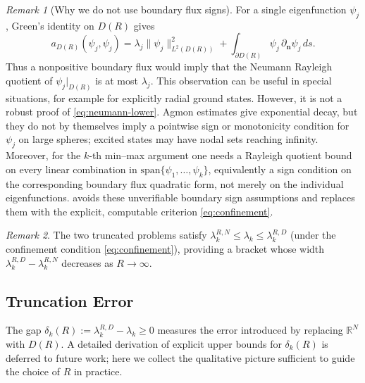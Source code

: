 \documentclass[11pt]{article}
\theoremstyle{plain}
\theoremstyle{definition}
\theoremstyle{remark}
\newtheorem{remark}{Remark}
\newcommand{\R}{\mathbb{R}}
\begin{document}
\begin{remark}[Why we do not use boundary flux signs]
\label{rmk:boundary-sign}
For a single eigenfunction $\psi_j$, Green's identity on $D(R)$
gives
\[
  a_{D(R)}(\psi_j,\psi_j)
  =
  \lambda_j\|\psi_j\|_{L^2(D(R))}^2
  +
  \int_{\partial D(R)}\psi_j\,\partial_{\bm n}\psi_j\,ds .
\]
Thus a nonpositive boundary flux would imply that the Neumann
Rayleigh quotient of $\psi_j|_{D(R)}$ is at most $\lambda_j$.
This observation can be useful in special situations, for example
for explicitly radial ground states.
However, it is not a robust proof of \eqref{eq:neumann-lower}.
Agmon estimates \cite{Agmon1982} give exponential decay, but they
do not by themselves imply a pointwise sign or monotonicity
condition for $\psi_j$ on large spheres; excited states may have
nodal sets reaching infinity.  Moreover, for the $k$-th min--max
argument one needs a Rayleigh quotient bound on every linear
combination in $\mathrm{span}\{\psi_1,\ldots,\psi_k\}$,
equivalently a sign condition on the corresponding boundary flux
quadratic form, not merely on the individual eigenfunctions.
 avoids these unverifiable boundary sign
assumptions and replaces them with the explicit, computable
criterion \eqref{eq:confinement}.
\end{remark}

\begin{remark}
The two truncated problems satisfy
$\lambda_k^{R,N} \le \lambda_k \le \lambda_k^{R,D}$
(under the confinement condition \eqref{eq:confinement}),
providing a bracket whose width $\lambda_k^{R,D} - \lambda_k^{R,N}$
decreases as $R \to \infty$.
\end{remark}

\subsection{Truncation Error}
\label{subsec:truncation-error}

The gap $\delta_k(R) := \lambda_k^{R,D} - \lambda_k \ge 0$
measures the error introduced by replacing $\R^N$ with $D(R)$.
A detailed derivation of explicit upper bounds for $\delta_k(R)$
is deferred to future work; here we collect the qualitative
picture sufficient to guide the choice of $R$ in practice.
\end{document}
